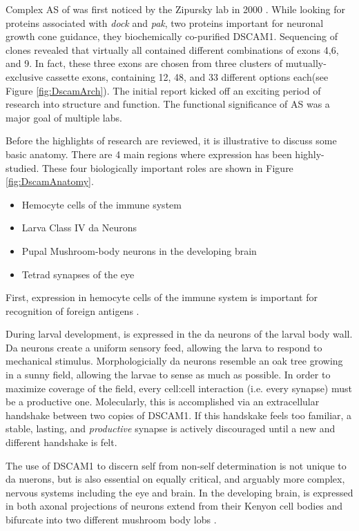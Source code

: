     Complex AS of\dscam{} was first noticed by the Zipursky lab in 2000 \citep{Schmucker2000}. While looking for proteins associated with \textit{dock} and \textit{pak}, two proteins important for neuronal growth cone guidance, they biochemically co-purified DSCAM1. Sequencing of \dscam{} clones revealed that virtually all contained different combinations of exons 4,6, and 9. In fact, these three exons are chosen from three clusters of mutually-exclusive cassette exons, containing 12, 48, and 33 different options each(see Figure \ref{fig:DscamArch}). The initial report kicked off an exciting period of research into \dscam{} structure and function. The functional significance of \dscam{} AS was a major goal of multiple labs.

    Before the highlights of \dscam{} research are reviewed, it is illustrative to discuss some basic \flies{} anatomy. There are 4 main regions where \dscam{} expression has been highly-studied. These four biologically important roles are shown in Figure \ref{fig:DscamAnatomy}.

    \begin{itemize} \itemsep0.5pt \parskip0pt  %
      \item Hemocyte cells of the immune system
      \item Larva Class IV da Neurons 
      \item Pupal Mushroom-body neurons in the developing brain
      \item Tetrad synapses of the eye
      \end{itemize}

    First, \dscam{} expression in hemocyte cells of the immune system is important for recognition of foreign antigens \citep{Watson2005}. 

    During larval development, \dscam{} is expressed in the da neurons of the larval body wall. Da neurons create a uniform sensory feed, allowing the larva to respond to mechanical stimulus. Morphologicially da neurons resemble an oak tree growing in a sunny field, allowing the larvae to sense as much as possible. In order to maximize coverage of the field, every cell:cell interaction (i.e. every synapse) must be a productive one. Molecularly, this is accomplished via an extracellular handshake between two copies of DSCAM1. If this handskake feels too familiar, a stable, lasting, and \textit{productive} synapse is actively discouraged until a new and different handshake is felt. 

    The use of DSCAM1 to discern self from non-self determination is not unique to da nuerons, but is also essential on equally critical, and arguably more complex, nervous systems including the eye and brain. In the developing brain, \dscam{} is expressed in both axonal projections of neurons extend from their Kenyon cell bodies and bifurcate into two different mushroom body lobs \citep{Zhan2004}. 

